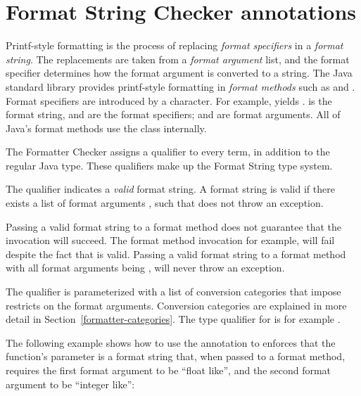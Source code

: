 \section{Format String Checker annotations\label{formatter-annotations}}

Printf-style formatting is the process of replacing \emph{format specifiers} in
a \emph{format string}. The replacements are taken from a \emph{format argument}
list, and the format specifier determines how the format argument is converted to a
string. The Java standard library provides printf-style formatting in \emph{format methods} such as
and 
.
Format specifiers are introduced by a \code{\%} character. For example,
 yields .   is
the format string,  and  are the format specifiers;
 and  are format arguments.  All of Java's format
methods use the  class internally.

The Formatter Checker assigns a qualifier to every term, in addition to the
regular Java type. These qualifiers make up the Format String type system.

The  qualifier indicates a
\emph{valid} format string. A format string  is valid if there exists a
list of format arguments , such that 
does not throw an exception. 

Passing a valid format string to a format method does not guarantee that the 
invocation will succeed. The format method invocation 
for example, will fail despite the fact that  is valid. Passing
a valid format string to a format method with all format arguments being , will
never throw an exception.

The  qualifier is parameterized with
a list of conversion categories that impose restricts on the format arguments.
Conversion categories are explained in more detail in
Section~\ref{formatter-categories}.  The type qualifier for  is
for example .

The following example shows how to use the  annotation to
enforces that the function's parameter is a format string that, when
passed to a format method, requires the first format argument to be ``float like'',
and the second format argument to be ``integer like'':


